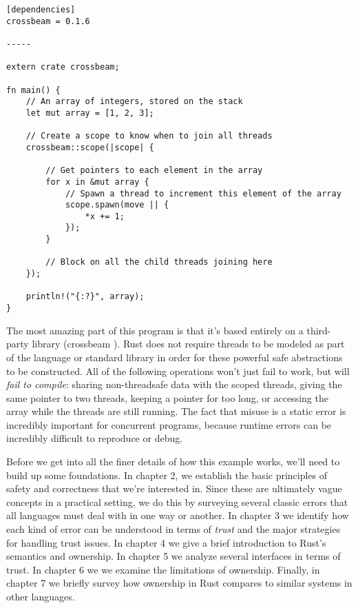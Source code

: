 \begin{verbatim}
[dependencies]
crossbeam = 0.1.6

-----

extern crate crossbeam;

fn main() {
    // An array of integers, stored on the stack
    let mut array = [1, 2, 3];

    // Create a scope to know when to join all threads
    crossbeam::scope(|scope| {

        // Get pointers to each element in the array
        for x in &mut array {
            // Spawn a thread to increment this element of the array
            scope.spawn(move || {
                *x += 1;
            });
        }

        // Block on all the child threads joining here
    });

    println!("{:?}", array);
}
\end{verbatim}

The most amazing part of this program is that it's based entirely on a third-
party library (crossbeam \cite{crossbeam}). Rust does not require threads to be modeled as part
of the language or standard library in order for these powerful safe
abstractions to be constructed. All of the following operations won't just fail
to work, but will \emph{fail to compile}: sharing non-threadsafe data with
the scoped threads, giving the same pointer to two threads, keeping a pointer for too
long, or accessing the array while the threads are still running. The fact that
misuse is a static error is incredibly important for concurrent programs, because
runtime errors can be incredibly difficult to reproduce or debug.

Before we get into all the finer details of how this example works, we'll need
to build up some foundations. In chapter 2, we establish
the basic principles of safety and correctness that we're interested in. Since
these are ultimately vague concepts in a practical setting, we do this by
surveying several classic errors that all languages must deal with in one way or
another. In chapter 3
we identify how each kind of error can be understood in terms of
\emph{trust} and the major strategies for handling trust issues. In chapter 4
we give a brief introduction to Rust's semantics and ownership. In
chapter 5 we analyze several interfaces in terms of trust. In chapter 6 we we
examine the limitations of ownership. Finally, in chapter 7 we briefly survey
how ownership in Rust compares to similar systems in other languages.

